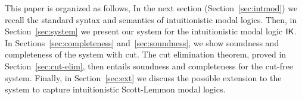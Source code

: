 This paper is organized as follows, In the next section (Section~\ref{sec:intmod}) we recall the standard syntax and semantics of intuitionistic modal logics. Then, in Section~\ref{sec:system} we present our system for the intuitionistic modal logic $\mathsf{IK}$. In Sections~\ref{sec:completeness} and~\ref{sec:soundness}, we show soundness and completeness of the system with cut. The cut elimination theorem, proved in Section~\ref{sec:cut-elim}, then entails soundness and completeness for the cut-free system. Finally, in Section~\ref{sec:ext} we discuss the possible extension to the system to capture intuitionistic Scott-Lemmon modal logics.



